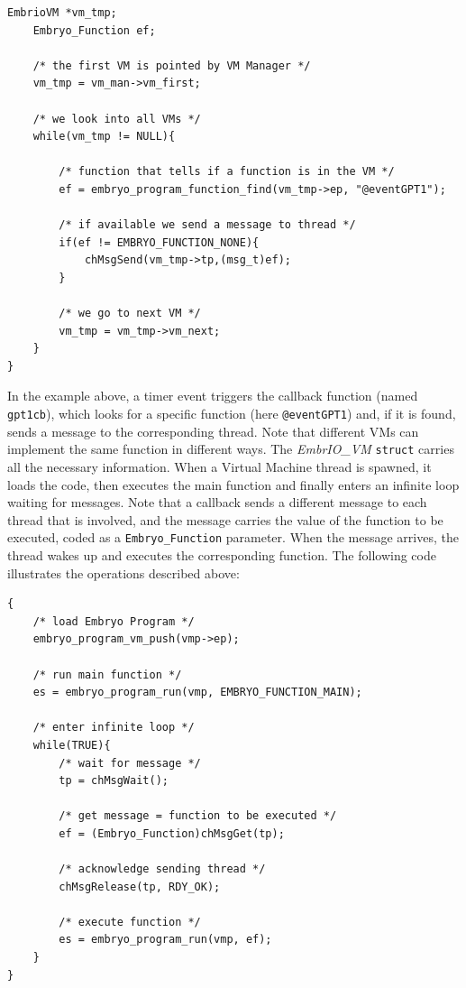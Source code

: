 \documentclass[a4paper,10pt]{article}
\begin{document}
\begin{multicols}{2}
\begin{lstlisting}[caption={Callback looking for a function in VMs}]
	EmbrioVM *vm_tmp;
	Embryo_Function ef;
	
	/* the first VM is pointed by VM Manager */
	vm_tmp = vm_man->vm_first;
	
	/* we look into all VMs */
	while(vm_tmp != NULL){
		
		/* function that tells if a function is in the VM */
		ef = embryo_program_function_find(vm_tmp->ep, "@eventGPT1");
		
		/* if available we send a message to thread */
		if(ef != EMBRYO_FUNCTION_NONE){
			chMsgSend(vm_tmp->tp,(msg_t)ef);
		}
		
		/* we go to next VM */
		vm_tmp = vm_tmp->vm_next;
	}
}
\end{lstlisting}
\medskip
In the example above, a timer event triggers the callback function (named \texttt{gpt1cb}), which looks for a specific function (here \texttt{@eventGPT1}) and, if it is found, sends a message to the corresponding thread. Note that different VMs can implement the same function in different ways.\newline
The \textit{EmbrIO\_VM} \texttt{struct} carries all the necessary information.\newline
When a Virtual Machine thread is spawned, it loads the code, then executes the main function and finally enters an infinite loop waiting for messages. Note that a callback sends a different message to each thread that is involved, and the message carries the value of the function to be executed, coded as a \texttt{Embryo\_Function} parameter. When the message arrives, the thread wakes up and executes the corresponding function. The following code illustrates the operations described above:
\medskip
\lstset{language=C}
\begin{lstlisting}[caption={Callback looking for a function in VMs}]
{
	/* load Embryo Program */
	embryo_program_vm_push(vmp->ep);
	
	/* run main function */
	es = embryo_program_run(vmp, EMBRYO_FUNCTION_MAIN);
	
	/* enter infinite loop */
	while(TRUE){
		/* wait for message */
		tp = chMsgWait();
		
		/* get message = function to be executed */
		ef = (Embryo_Function)chMsgGet(tp);
		
		/* acknowledge sending thread */
		chMsgRelease(tp, RDY_OK);
		
		/* execute function */
		es = embryo_program_run(vmp, ef);
	}
}
\end{lstlisting}\medskip


\end{multicols}
\end{document}
